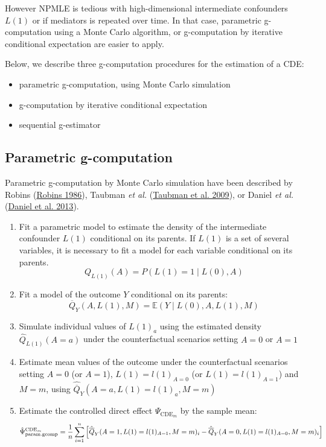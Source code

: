 \documentclass[
]{book}
\providecommand{\tightlist}{%
  \setlength{\itemsep}{0pt}\setlength{\parskip}{0pt}}
\begin{document}
However NPMLE is tedious with high-dimensional intermediate confounders \(L(1)\) or if mediators is repeated over time. In that case, parametric g-computation using a Monte Carlo algorithm, or g-computation by iterative conditional expectation are easier to apply.

Below, we describe three g-computation procedures for the estimation of a CDE:

\begin{itemize}
\tightlist
\item
  parametric g-computation, using Monte Carlo simulation
\item
  g-computation by iterative conditional expectation
\item
  sequential g-estimator
\end{itemize}

\hypertarget{parametric-g-computation}{%
\subsection{Parametric g-computation}\label{parametric-g-computation}}

Parametric g-computation by Monte Carlo simulation have been described by Robins (\protect\hyperlink{ref-robins1986}{Robins 1986}), Taubman \emph{et al.} (\protect\hyperlink{ref-taubman2009}{Taubman et al. 2009}), or Daniel \emph{et al.} (\protect\hyperlink{ref-daniel2013}{Daniel et al. 2013}).

\begin{enumerate}
\def\labelenumi{\arabic{enumi}.}
\item
  Fit a parametric model to estimate the density of the intermediate confounder \(L(1)\) conditional on its parents. If \(L(1)\) is a set of several variables, it is necessary to fit a model for each variable conditional on its parents.
  \begin{equation}
    Q_{L(1)}(A) = P(L(1)=1 \mid L(0),A)
  \end{equation}
\item
  Fit a model of the outcome \(Y\) conditional on its parents:
  \begin{equation}
    \overline{Q}_Y(A,L(1),M) = \mathbb{E}\left(Y \mid L(0),A,L(1),M \right)
  \end{equation}
\item
  Simulate individual values of \(L(1)_a\) using the estimated density \(\hat{Q}_{L(1)}(A=a)\) under the counterfactual scenarios setting \(A=0\) or \(A=1\)
\item
  Estimate mean values of the outcome under the counterfactual scenarios setting \(A=0\) (or \(A=1\)), \(L(1)=l(1)_{A=0}\) (or \(L(1)=l(1)_{A=1}\)) and \(M=m\), using \(\hat{\overline{Q}}_Y(A=a,L(1)=l(1)_a,M=m)\)
\item
  Estimate the controlled direct effect \(\Psi_{\text{CDE}_m}\) by the sample mean:
  \begin{equation}
    \small \hat{\Psi}^{\text{CDE}_m}_{\text{param.gcomp}} = \frac{1}{n} \sum_{i=1}^n \left[ \hat{\overline{Q}}_Y(A=1,L(1)=l(1)_{A=1},M=m)_i - \hat{\overline{Q}}_Y(A=0,L(1)=l(1)_{A=0},M=m)_i \right]
  \end{equation}
\end{enumerate}
\end{document}
